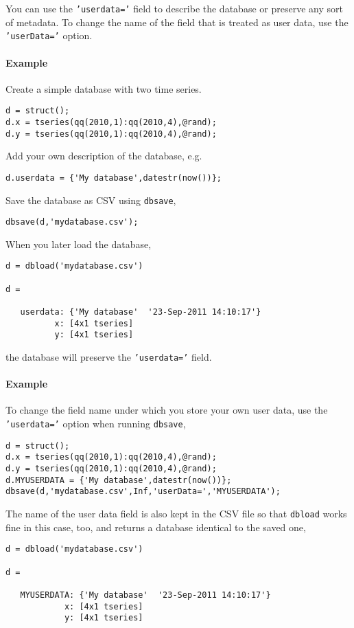 You can use the \texttt{'userdata='} field to describe the database or
preserve any sort of metadata. To change the name of the field that is
treated as user data, use the \texttt{'userData='} option.

\paragraph{Example}\label{example}

Create a simple database with two time series.

\begin{verbatim}
d = struct();
d.x = tseries(qq(2010,1):qq(2010,4),@rand);
d.y = tseries(qq(2010,1):qq(2010,4),@rand);
\end{verbatim}

Add your own description of the database, e.g.

\begin{verbatim}
d.userdata = {'My database',datestr(now())};
\end{verbatim}

Save the database as CSV using \texttt{dbsave},

\begin{verbatim}
dbsave(d,'mydatabase.csv');
\end{verbatim}

When you later load the database,

\begin{verbatim}
d = dbload('mydatabase.csv')

d = 

   userdata: {'My database'  '23-Sep-2011 14:10:17'}
          x: [4x1 tseries]
          y: [4x1 tseries]
\end{verbatim}

the database will preserve the \texttt{'userdata='} field.

\paragraph{Example}\label{example-1}

To change the field name under which you store your own user data, use
the \texttt{'userdata='} option when running \texttt{dbsave},

\begin{verbatim}
d = struct();
d.x = tseries(qq(2010,1):qq(2010,4),@rand);
d.y = tseries(qq(2010,1):qq(2010,4),@rand);
d.MYUSERDATA = {'My database',datestr(now())};
dbsave(d,'mydatabase.csv',Inf,'userData=','MYUSERDATA');
\end{verbatim}

The name of the user data field is also kept in the CSV file so that
\texttt{dbload} works fine in this case, too, and returns a database
identical to the saved one,

\begin{verbatim}
d = dbload('mydatabase.csv')

d = 

   MYUSERDATA: {'My database'  '23-Sep-2011 14:10:17'}
            x: [4x1 tseries]
            y: [4x1 tseries]
\end{verbatim}


